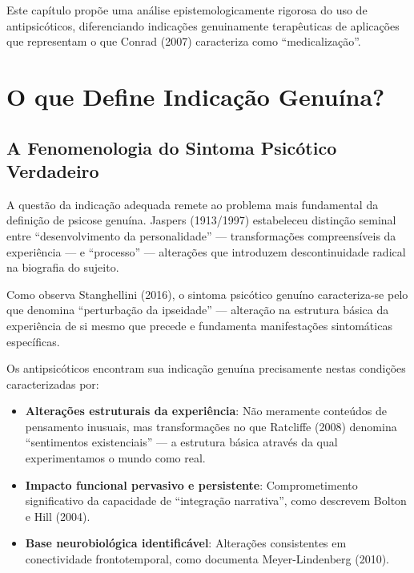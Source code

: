 Este capítulo propõe uma análise epistemologicamente rigorosa do uso de antipsicóticos, diferenciando indicações genuinamente terapêuticas de aplicações que representam o que Conrad (2007) caracteriza como \enquote{medicalização}.

\section{O que Define Indicação Genuína?}
\label{sec:indicacao-genuina}

\subsection{A Fenomenologia do Sintoma Psicótico Verdadeiro}

A questão da indicação adequada remete ao problema mais fundamental da definição de psicose genuína. Jaspers (1913/1997) estabeleceu distinção seminal entre \enquote{desenvolvimento da personalidade} --- transformações compreensíveis da experiência --- e \enquote{processo} --- alterações que introduzem descontinuidade radical na biografia do sujeito.

Como observa Stanghellini (2016), o sintoma psicótico genuíno caracteriza-se pelo que denomina \enquote{perturbação da ipseidade} --- alteração na estrutura básica da experiência de si mesmo que precede e fundamenta manifestações sintomáticas específicas.

Os antipsicóticos encontram sua indicação genuína precisamente nestas condições caracterizadas por:

\begin{itemize}
\item \textbf{Alterações estruturais da experiência}: Não meramente conteúdos de pensamento inusuais, mas transformações no que Ratcliffe (2008) denomina \enquote{sentimentos existenciais} --- a estrutura básica através da qual experimentamos o mundo como real.

\item \textbf{Impacto funcional pervasivo e persistente}: Comprometimento significativo da capacidade de \enquote{integração narrativa}, como descrevem Bolton e Hill (2004).

\item \textbf{Base neurobiológica identificável}: Alterações consistentes em conectividade frontotemporal, como documenta Meyer-Lindenberg (2010).
\end{itemize}

